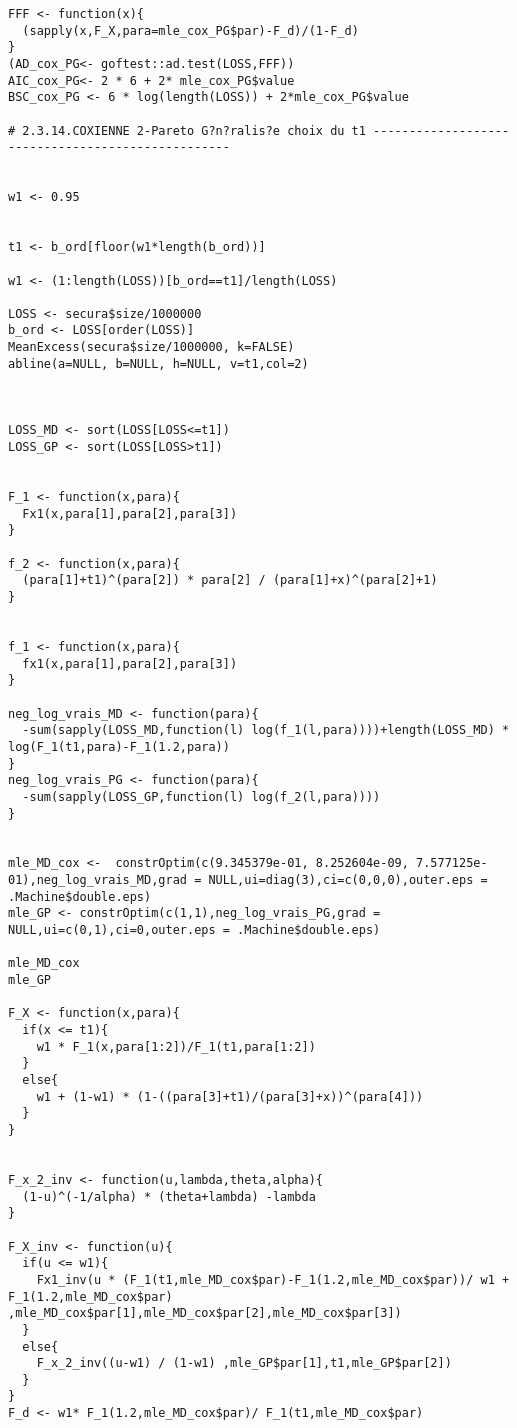 \begin{verbatim}
FFF <- function(x){
  (sapply(x,F_X,para=mle_cox_PG$par)-F_d)/(1-F_d)
}
(AD_cox_PG<- goftest::ad.test(LOSS,FFF))
AIC_cox_PG<- 2 * 6 + 2* mle_cox_PG$value
BSC_cox_PG <- 6 * log(length(LOSS)) + 2*mle_cox_PG$value

# 2.3.14.COXIENNE 2-Pareto G?n?ralis?e choix du t1 --------------------------------------------------


w1 <- 0.95


t1 <- b_ord[floor(w1*length(b_ord))]

w1 <- (1:length(LOSS))[b_ord==t1]/length(LOSS)

LOSS <- secura$size/1000000
b_ord <- LOSS[order(LOSS)]
MeanExcess(secura$size/1000000, k=FALSE)
abline(a=NULL, b=NULL, h=NULL, v=t1,col=2)



LOSS_MD <- sort(LOSS[LOSS<=t1])
LOSS_GP <- sort(LOSS[LOSS>t1])


F_1 <- function(x,para){
  Fx1(x,para[1],para[2],para[3])
}

f_2 <- function(x,para){
  (para[1]+t1)^(para[2]) * para[2] / (para[1]+x)^(para[2]+1)
}


f_1 <- function(x,para){
  fx1(x,para[1],para[2],para[3])
}

neg_log_vrais_MD <- function(para){
  -sum(sapply(LOSS_MD,function(l) log(f_1(l,para))))+length(LOSS_MD) * log(F_1(t1,para)-F_1(1.2,para))
}
neg_log_vrais_PG <- function(para){
  -sum(sapply(LOSS_GP,function(l) log(f_2(l,para))))
}


mle_MD_cox <-  constrOptim(c(9.345379e-01, 8.252604e-09, 7.577125e-01),neg_log_vrais_MD,grad = NULL,ui=diag(3),ci=c(0,0,0),outer.eps = .Machine$double.eps)
mle_GP <- constrOptim(c(1,1),neg_log_vrais_PG,grad = NULL,ui=c(0,1),ci=0,outer.eps = .Machine$double.eps)

mle_MD_cox
mle_GP

F_X <- function(x,para){
  if(x <= t1){
    w1 * F_1(x,para[1:2])/F_1(t1,para[1:2])
  }
  else{
    w1 + (1-w1) * (1-((para[3]+t1)/(para[3]+x))^(para[4]))
  }  
}


F_x_2_inv <- function(u,lambda,theta,alpha){
  (1-u)^(-1/alpha) * (theta+lambda) -lambda
}

F_X_inv <- function(u){
  if(u <= w1){
    Fx1_inv(u * (F_1(t1,mle_MD_cox$par)-F_1(1.2,mle_MD_cox$par))/ w1 + F_1(1.2,mle_MD_cox$par) ,mle_MD_cox$par[1],mle_MD_cox$par[2],mle_MD_cox$par[3])
  }
  else{
    F_x_2_inv((u-w1) / (1-w1) ,mle_GP$par[1],t1,mle_GP$par[2])
  }  
}
F_d <- w1* F_1(1.2,mle_MD_cox$par)/ F_1(t1,mle_MD_cox$par)


\end{verbatim}
